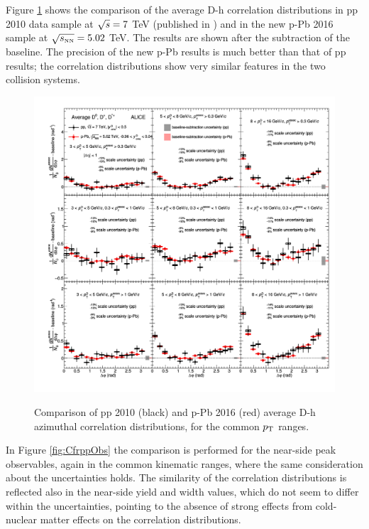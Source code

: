 Figure \ref{fig:CfrppCorrel} shows the comparison of the average D-h correlation distributions in pp 2010 data sample at $\sqrt{s} = 7$ TeV (published in \cite{ALICEDhcorr}) and in the new p-Pb 2016 sample at $\sqrt{s_{\rm \scriptscriptstyle NN}} = 5.02$ TeV. The results are shown after the subtraction of the baseline. The precision of the new p-Pb results is much better than that of pp results; the correlation distributions show very similar features in the two collision systems. 

\begin{figure}[!htbp]
\centering
{\includegraphics[width=\linewidth]{figures/CfrPPandModels/plotComparison_WeightedAverage_pp_pPb_UniqueCanvas_Style1.png}}
\caption{Comparison of pp 2010 (black) and p-Pb 2016 (red) average D-h azimuthal correlation distributions, for the common $p_{\rm T}$ ranges.}
\label{fig:CfrppCorrel}
\end{figure}

In Figure \ref{fig:CfrppObs} the comparison is performed for the near-side peak observables, again in the common kinematic ranges, where the same consideration about the uncertainties holds. The similarity of the correlation distributions is reflected also in the near-side yield and width values, which do not seem to differ within the uncertainties, pointing to the absence of strong effects from cold-nuclear matter effects on the correlation distributions.

